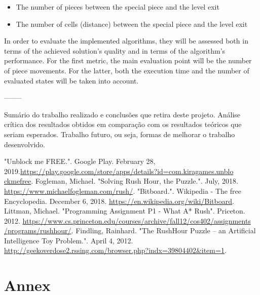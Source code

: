 \documentclass[conference]{IEEEtran}
\begin{document}
\begin{itemize}
    \item The number of pieces between the special piece and the level exit
    \item The number of cells (distance) between the special piece and the level exit
\end{itemize}

In order to evaluate the implemented algorithms, they will be assessed both in terms of the achieved solution's quality and in terms of the algorithm's performance. For the first metric, the main evaluation point will be the number of piece movements. For the latter, both the execution time and the number of evaluated states will be taken into account.

--------

Sumário do trabalho realizado e conclusões que retira deste projeto. Análise crítica dos resultados obtidos em comparação com os resultados teóricos que seriam esperados. Trabalho futuro, ou seja, formas de melhorar o trabalho desenvolvido.

\begin{thebibliography}{00}
    
 "Unblock me FREE.". Google Play. February 28, 2019.\href{https://play.google.com/store/apps/details?id=com.kiragames.unblockmefree}{https://play.google.com/store/apps/details?id=com.kiragames.unblo\\ckmefree}.
 Fogleman, Michael. "Solving Rush Hour, the Puzzle.". July, 2018. \href{https://www.michaelfogleman.com/rush/}{https://www.michaelfogleman.com/rush/}.
 "Bitboard.". Wikipedia - The free Encyclopedia. December 6, 2018. \href{https://en.wikipedia.org/wiki/Bitboard}{https://en.wikipedia.org/wiki/Bitboard}.
 Littman, Michael. "Programming Assignment P1 - What A* Rush". Priceton. 2012. \href{https://www.cs.princeton.edu/courses/archive/fall12/cos402/assignments/programs/rushhour/}{https://www.cs.princeton.edu/courses/archive/fall12/cos402/assignments\\/programs/rushhour/}.
 Findling, Rainhard. "The RushHour Puzzle – an Artificial Intelligence Toy Problem.". April 4, 2012. \href{http://geekoverdose2.rssing.com/browser.php?indx=39804402\&item=1}{http://geekoverdose2.rssing.com/browser.php?indx=39804402\&item=1}.
\end{thebibliography}

\section{Annex} \label{sec:annex}
\end{document}
